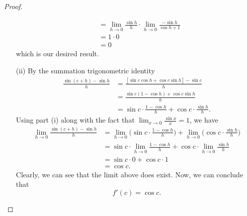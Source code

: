 \documentclass[a4paper]{article}
\begin{document}
\begin{proof}
\begin{enumerate}
\begin{align*}
                                                          &= \lim_{ h \to 0 }  \frac{ \sin h  }{ h  }  \cdot \lim_{ h \to 0 } \frac{ - \sin h  }{  \cos h + 1  } \\
                                                          &= 1 \cdot 0 \\ 
                                                          &= 0
        \end{align*}
        which is our desired result.
        \item[(ii)] By the summation trigonometric identity  
            \begin{align*}
                \frac{ \sin (c + h) - \sin h  }{  h } &=  \frac{ [\sin c \cos h + \cos c \sin h ] - \sin c  }{ h }   \\
                                                      &= \frac{ \sin c (1 - \cos h) + \cos c \sin h }{ h } \\
                                                      &=  \sin c \cdot \frac{ 1 - \cos h  }{  h  }  + \cos c \cdot \frac{ \sin h  }{ h }. 
            \end{align*}
            Using part (i) along with the fact that \( \lim_{ x \to 0 } \displaystyle  \frac{ \sin x  }{  x  }  = 1  \), we have 
            \begin{align*}
                \lim_{ h \to 0 }  \frac{ \sin (c+h) - \sin h  }{ h  } &= \lim_{ h \to 0 }  \Big(  \sin c \cdot \frac{ 1 - \cos h  }{  h  }   \Big) + \lim_{ h \to 0 }  \Big(  \cos c \cdot \frac{ \sin h  }{ h }  \Big) \\
                                                                      &= \sin c \cdot \lim_{ h \to 0 }  \frac{ 1 - \cos h  }{ h  }  + \cos c \cdot \lim_{ h \to 0 }  \frac{ \sin h  }{ h } \\ 
                                                                      &= \sin c \cdot 0 + \cos c \cdot 1 \\
                                                                      &= \cos c.
            \end{align*}
            Clearly, we can see that the limit above does exist. Now, we can conclude that 
            \[  f'(c) = \cos c. \]
    \end{enumerate}
\end{proof}
\end{document}
